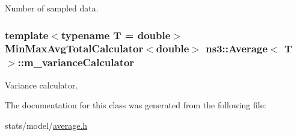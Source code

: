 Number of sampled data. 

\subsubsection[{\texorpdfstring{m\+\_\+variance\+Calculator}{m_varianceCalculator}}]{\setlength{\rightskip}{0pt plus 5cm}template$<$typename T = double$>$ {\bf Min\+Max\+Avg\+Total\+Calculator}$<$double$>$ {\bf ns3\+::\+Average}$<$ T $>$\+::m\+\_\+variance\+Calculator\hspace{0.3cm}{\ttfamily [private]}}\hypertarget{classns3_1_1Average_ad9ad5a2019b36ba70927c40e4d9ed4f2}{}\label{classns3_1_1Average_ad9ad5a2019b36ba70927c40e4d9ed4f2}


Variance calculator. 



The documentation for this class was generated from the following file\+:\begin{DoxyCompactItemize}
\item 
stats/model/\hyperlink{average_8h}{average.\+h}\end{DoxyCompactItemize}
